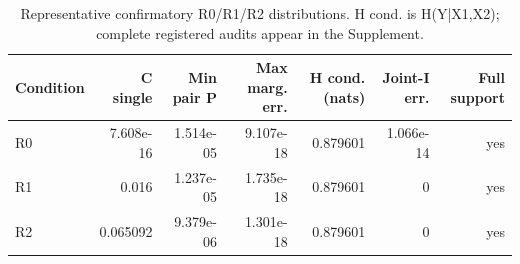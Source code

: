 \begin{table}[!htbp]
\centering
\caption{Representative confirmatory R0/R1/R2 distributions. H cond. is H(Y|X1,X2); complete registered audits appear in the Supplement.}
\label{tab:table01-distribution-invariants-main}
\small
\setlength{\tabcolsep}{4pt}
\begin{tabular}{lrrrrrr}
\toprule
Condition & C single & Min pair P & Max marg. err. & H cond. (nats) & Joint-I err. & Full support \\
\midrule
R0 & 7.608e-16 & 1.514e-05 & 9.107e-18 & 0.879601 & 1.066e-14 & yes \\
R1 & 0.016 & 1.237e-05 & 1.735e-18 & 0.879601 & 0 & yes \\
R2 & 0.065092 & 9.379e-06 & 1.301e-18 & 0.879601 & 0 & yes \\
\bottomrule
\end{tabular}
\end{table}
